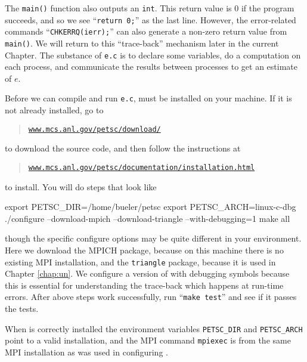 The \texttt{main()} function also outputs an \texttt{int}.  This return value is $0$ if the program succeeds, and so we see ``\texttt{return 0;}'' as the last line.  However, the error-related commands ``\texttt{CHKERRQ(ierr);}'' can also generate a non-zero return value from \texttt{main()}.  We will return to this ``trace-back'' mechanism later in the current Chapter.  The substance of \texttt{e.c} is to declare some variables, do a computation on each process, and communicate the results between processes to get an estimate of $e$.



Before we can compile and run \texttt{e.c}, \PETSc must be installed on your machine.  If it is not already installed, go to
\begin{quote}
\href{http://www.mcs.anl.gov/petsc/download/index.html}{\texttt{www.mcs.anl.gov/petsc/download/}}
\end{quote}
to download the source code, and then follow the instructions at
\begin{quote}
\href{http://www.mcs.anl.gov/petsc/documentation/installation.html}{\texttt{www.mcs.anl.gov/petsc/documentation/installation.html}}
\end{quote}
to install.  You will do steps that look like
\begin{cline}
export PETSC_DIR=/home/bueler/petsc
export PETSC_ARCH=linux-c-dbg
./configure --download-mpich --download-triangle --with-debugging=1
make all
\end{cline}
though the specific configure options may be quite different in your environment.  Here we download the MPICH package, because on this machine there is no existing MPI installation, and the \texttt{triangle} package, because it is used in Chapter \ref{chap:un}.  We configure a version of \PETSc with debugging symbols because this is essential for understanding the trace-back which happens at run-time errors.  After above steps work successfully, run ``\texttt{make test}'' and see if it passes the tests.

When \PETSc is correctly installed the environment variables \texttt{PETSC\_DIR} and \texttt{PETSC\_ARCH} point to a valid installation, and the MPI command \texttt{mpiexec} is from the same MPI installation as was used in configuring \PETSc.


